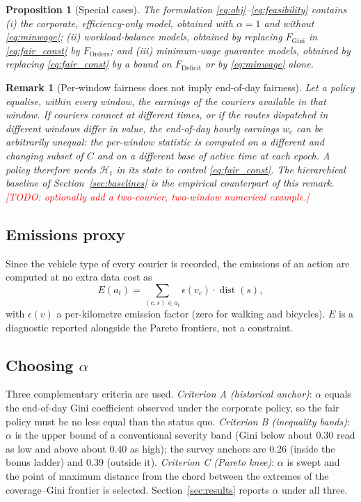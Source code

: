 \documentclass[preprint,12pt,authoryear]{elsarticle}%
\newcommand{\todo}[1]{\textcolor{red}{[TODO: #1]}}
\newcommand{\Hist}{\mathcal{H}}
\newcommand{\FG}{F_{\text{Gini}}}
\newcommand{\FD}{F_{\text{Deficit}}}
\newcommand{\FO}{F_{\text{Orders}}}
\DeclareMathOperator{\dist}{dist}
\newtheorem{proposition}{Proposition}
\newtheorem{remark}{Remark}
\begin{document}
\begin{proposition}[Special cases]
\label{prop:special}
The formulation \eqref{eq:obj}--\eqref{eq:feasibility} contains (i) the corporate, efficiency-only model, obtained with $\alpha = 1$ and without \eqref{eq:minwage}; (ii) workload-balance models, obtained by replacing $\FG$ in \eqref{eq:fair_const} by $\FO$; and (iii) minimum-wage guarantee models, obtained by replacing \eqref{eq:fair_const} by a bound on $\FD$ or by \eqref{eq:minwage} alone.
\end{proposition}

\begin{remark}[Per-window fairness does not imply end-of-day fairness]
\label{rem:window}
Let a policy equalise, within every window, the earnings of the couriers available in that window. If couriers connect at different times, or if the routes dispatched in different windows differ in value, the end-of-day hourly earnings $w_c$ can be arbitrarily unequal: the per-window statistic is computed on a different and changing subset of $C$ and on a different base of active time at each epoch. A policy therefore needs $\Hist_t$ in its state to control \eqref{eq:fair_const}. The hierarchical baseline of Section~\ref{sec:baselines} is the empirical counterpart of this remark. \todo{optionally add a two-courier, two-window numerical example.}
\end{remark}

\subsection{Emissions proxy}

Since the vehicle type of every courier is recorded, the emissions of an action are computed at no extra data cost as
\begin{equation}
E(a_t) = \sum_{(c,s) \in a_t} \epsilon(v_c)\cdot \dist(s),
\label{eq:emissions}
\end{equation}
with $\epsilon(v)$ a per-kilometre emission factor (zero for walking and bicycles). $E$ is a diagnostic reported alongside the Pareto frontiers, not a constraint.

\subsection{Choosing $\alpha$}
\label{sec:alpha}

Three complementary criteria are used. \emph{Criterion A (historical anchor)}: $\alpha$ equals the end-of-day Gini coefficient observed under the corporate policy, so the fair policy must be no less equal than the status quo. \emph{Criterion B (inequality bands)}: $\alpha$ is the upper bound of a conventional severity band (Gini below about 0.30 read as low and above about 0.40 as high); the survey anchors are 0.26 (inside the bonus ladder) and 0.39 (outside it). \emph{Criterion C (Pareto knee)}: $\alpha$ is swept and the point of maximum distance from the chord between the extremes of the coverage--Gini frontier is selected. Section~\ref{sec:results} reports $\alpha$ under all three.
\end{document}
